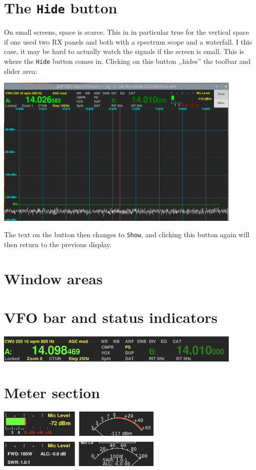 \documentclass[12pt]{book}
\begin{document}
\section{The \texttt{Hide} button}

On small screens, space is scarce. This in in particular true
for the vertical space if one used two RX panels and both
with a spectrum scope and a waterfall. I this case, it may be
hard to actually watch the signals if the screen is small.
This is where the \texttt{Hide} button comes in. Clicking on
this button ,,hides'' the toolbar and slider area:

\begin{center}
\includegraphics[width=12cm]{Hidden.png}
\end{center}

The text on the button then changes to \texttt{Show}, and
clicking this button again will then return to the
previous display.

\section{Window areas}

\section{VFO bar and status  indicators}

\begin{center}
\includegraphics[width=12cm]{VFObar.png}
\end{center}

\section{Meter section}
\begin{center}
\includegraphics[width=8cm]{MeterDesigns.png}
\end{center}
\end{document}
